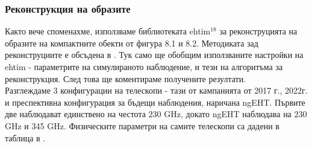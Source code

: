\documentclass[12pt]{article}
\numberwithin{equation}{section}
\numberwithin{figure}{section}
\begin{document}
	\subsubsection{Реконструкция на образите}
	
	Както вече споменахме, използваме библиотеката ehtim$^{18}$ за реконструцията на образите на компактните обекти от фигура 8.1 и 8.2. Методиката зад реконструциите е обсъдена в \cite{EHTIM}. Тук само ще обобщим използваните настройки на ehtim - параметрите на симулираното наблюдение, и тези на алгоритъма за реконструкция. След това ще коментираме получените резултати.\\
	
	Разглеждаме 3 конфигурации на телескопи - тази от кампанията от 2017 г., 2022г. и преспективна конфигурация за бъдещи наблюдения, наричана ngEHT. Първите две наблюдават единствено на честота $230$ GHz, докато ngEHT наблюдава на $230$ GHz и 345 GHz. Физическите параметри на самите телескопи са дадени в таблица в \cite{Deliyski2024}. \\
	
\end{document}
